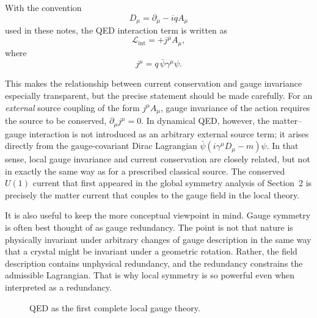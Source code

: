 \documentclass[11pt,a4paper]{article}
\begin{document}
With the convention
\[
D_\mu = \partial_\mu - i q A_\mu
\]
used in these notes, the QED interaction term is written as
\[
\mathcal{L}_{\text{int}} = + j^\mu A_\mu,
\]
where
\[
j^\mu = q\,\bar{\psi}\gamma^\mu\psi.
\]



This makes the relationship between current conservation and gauge invariance especially transparent, but the precise statement should be made carefully. For an \emph{external} source coupling of the form \(j^\mu A_\mu\), gauge invariance of the action requires the source to be conserved, \( \partial_\mu j^\mu = 0 \). In dynamical QED, however, the matter--gauge interaction is not introduced as an arbitrary external source term; it arises directly from the gauge-covariant Dirac Lagrangian \( \bar{\psi}(i\gamma^\mu D_\mu - m)\psi \). In that sense, local gauge invariance and current conservation are closely related, but not in exactly the same way as for a prescribed classical source. The conserved \(U(1)\) current that first appeared in the global symmetry analysis of Section~2 is precisely the matter current that couples to the gauge field in the local theory.


It is also useful to keep the more conceptual viewpoint in mind. Gauge symmetry is often best thought of as gauge redundancy. The point is not that nature is physically invariant under arbitrary changes of gauge description in the same way that a crystal might be invariant under a geometric rotation. Rather, the field description contains unphysical redundancy, and the redundancy constrains the admissible Lagrangian. That is why local symmetry is so powerful even when interpreted as a redundancy.




\begin{figure}[H]
\centering
{}
\caption{QED as the first complete local gauge theory.}
\label{fig:qed-structure-expanded}
\end{figure}
\end{document}
